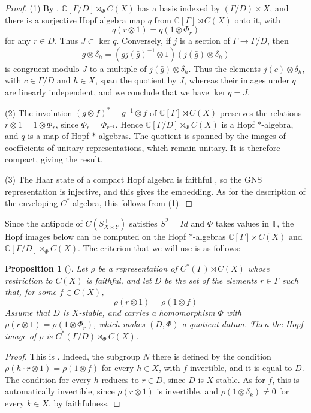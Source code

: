 \documentclass[11pt,reqno]{amsart}
\newtheorem{prop}[thm]{Proposition}
\theoremstyle{definition}
\numberwithin{equation}{section}
\begin{document}
\begin{proof}
(1) By \cite[Proposition 2.4]{Bic15}, $\mathbb C[\Gamma/D]\rtimes_\Phi C(X)$ has a basis indexed by $(\Gamma/D)\times X$, and there is a surjective Hopf algebra map $q$ from $\mathbb C[\Gamma]\rtimes C(X)$ onto it, with
$$q(r\otimes1)=q(1\otimes\Phi_r)$$
for any $r\in D$. Thus $J\subset\ker q$. Conversely, if $j$ is a section of $\Gamma\to\Gamma/D$, then
$$g\otimes\delta_h=(gj(\bar g)^{-1}\otimes1)(j(\bar g)\otimes\delta_h)$$
is congruent modulo $J$ to a multiple of $j(\bar g)\otimes\delta_h$. Thus the elements $j(c)\otimes\delta_h$, with $c\in\Gamma/D$ and $h\in X$, span the quotient by $J$, whereas their images under $q$ are linearly independent, and we conclude that we have $\ker q=J$.

(2) The involution $(g\otimes f)^*=g^{-1}\otimes\bar f$ of $\mathbb C[\Gamma]\rtimes C(X)$ preserves the relations $r\otimes1=1\otimes\Phi_r$, since $\bar\Phi_r=\Phi_{r^{-1}}$. Hence $\mathbb C[\Gamma/D]\rtimes_\Phi C(X)$ is a Hopf $*$-algebra, and $q$ is a map of Hopf $*$-algebras. The quotient is spanned by the images of coefficients of unitary representations, which remain unitary. It is therefore compact, giving the result.

(3) The Haar state of a compact Hopf algebra is faithful \cite[Theorems 3.7 and 4.4]{DK94}, so the GNS representation is injective, and this gives the embedding. As for the description of the enveloping $C^*$-algebra, this follows from (1).
\end{proof}

Since the antipode of $C(S^+_{X\times Y})$ satisfies $S^2=Id$ and $\Phi$ takes values in $\mathbb T$, the Hopf images below can be computed on the Hopf $*$-algebras $\mathbb C[\Gamma]\rtimes C(X)$ and $\mathbb C[\Gamma/D]\rtimes_\Phi C(X)$. The criterion that we will use is as follows:

\begin{prop}[\cite{Bic15}]\label{prop:hopf-image}
Let $\rho$ be a representation of $C^*(\Gamma)\rtimes C(X)$ whose restriction to $C(X)$ is faithful, and let $D$ be the set of the elements $r\in\Gamma$ such that, for some $f\in C(X)$,
$$\rho(r\otimes1)=\rho(1\otimes f)$$
Assume that $D$ is $X$-stable, and carries a homomorphism $\Phi$ with $\rho(r\otimes1)=\rho(1\otimes\Phi_r)$, which makes $(D,\Phi)$ a quotient datum. Then the Hopf image of $\rho$ is $C^*(\Gamma/D)\rtimes_\Phi C(X)$.
\end{prop}

\begin{proof}
This is \cite[Corollary 4.3]{Bic15}. Indeed, the subgroup $N$ there is defined by the condition $\rho(h\cdot r\otimes1)=\rho(1\otimes f)$ for every $h\in X$, with $f$ invertible, and it is equal to $D$. The condition for every $h$ reduces to $r\in D$, since $D$ is $X$-stable. As for $f$, this is automatically invertible, since $\rho(r\otimes1)$ is invertible, and $\rho(1\otimes\delta_k)\neq0$ for every $k\in X$, by faithfulness.
\end{proof}
\end{document}
